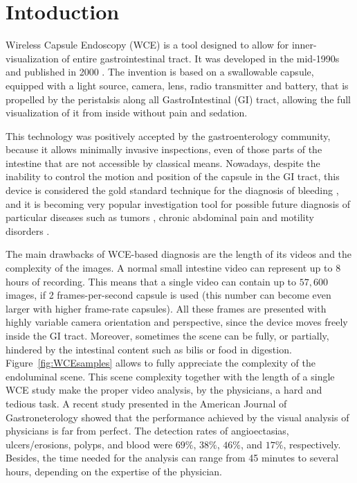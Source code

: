 \documentclass[review,12pt,3p]{elsarticle}
\begin{document}
\section{Intoduction}
\label{secIntro}

Wireless Capsule Endoscopy (WCE) is a tool designed to allow for inner-visualization of entire gastrointestinal tract. It was developed in the mid-1990s and published in 2000 \cite{iddan2000wireless}. %
The invention is based on a swallowable capsule, equipped with a light source, camera, lens, radio transmitter and battery, that is propelled by the peristalsis along all GastroIntestinal (GI) tract, allowing the full visualization of it from inside without pain and sedation.

This technology was positively accepted by the gastroenterology community, because it allows minimally invasive inspections, even of those parts of the intestine that are not accessible by classical means. 
Nowadays, despite the inability to control the motion and position of the capsule in the GI tract, this device is considered the gold standard technique for the diagnosis of  bleeding \cite{eliakim2004wireless,mustafa2013small}, and it is becoming very popular investigation tool for  possible future diagnosis of particular diseases such as tumors \cite{tumor2006,tumor2010}, chronic abdominal pain \cite{YangPlosOne} and motility disorders \cite{malagelada2012functional}.

The main drawbacks of WCE-based diagnosis are the length of its videos and the complexity of the images. A normal small intestine video can represent up to 8 hours of recording. This means that a single video can contain up to $57,600$ images, if 2 frames-per-second capsule is used (this number can become even larger with higher frame-rate capsules). All these frames are presented with highly variable camera orientation and perspective, since the device moves freely inside the GI tract. Moreover, sometimes the scene can be fully, or partially, hindered by the intestinal content such as bilis or food in digestion. Figure~\ref{fig:WCEsamples} allows  to fully appreciate the complexity of the endoluminal scene.  
This scene complexity together with the length of a single WCE study make the proper video analysis, by the physicians, a hard and tedious task. A recent study presented in the American Journal of Gastroneterology \cite{zheng2012detection} showed that the performance achieved by the visual analysis of physicians is far from perfect.
The detection rates of angioectasias, ulcers/erosions, polyps, and blood were $69\%$, $38\%$, $46\%$, and $17\%$, respectively. Besides, the time needed for the analysis can range from 45 minutes to several hours, depending on the expertise of the physician.
\end{document}
